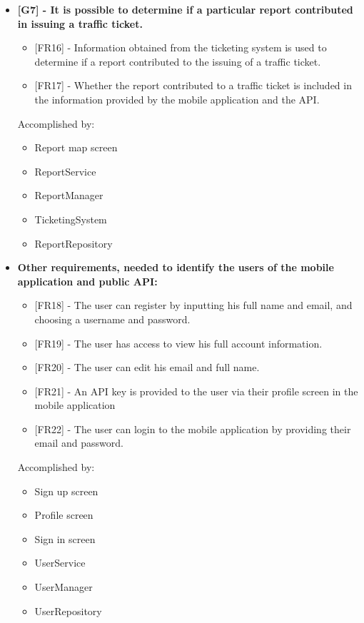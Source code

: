 \begin{itemize}[label={}]
    \item \textbf{[G7] - It is possible to determine if a particular report contributed in issuing a traffic ticket.}
        \begin{itemize}[label={}]
            \item {[FR16]} - Information obtained from the ticketing system is used to determine if a report contributed to the issuing of a traffic ticket.
            \item {[FR17]} - Whether the report contributed to a traffic ticket is included in the information provided by the mobile application and the API.
        \end{itemize}
        Accomplished by:
        \begin{itemize}[label={\textbullet}]
            \item Report map screen
            \item ReportService
            \item ReportManager
            \item TicketingSystem
            \item ReportRepository
        \end{itemize}

    \item \textbf{Other requirements, needed to identify the users of the mobile application and public API:}
        \begin{itemize}[label={}]
            \item {[FR18]} - The user can register by inputting his full name and email, and choosing a username and password.
            \item {[FR19]} - The user has access to view his full account information.
            \item {[FR20]} - The user can edit his email and full name.
            \item {[FR21]} - An API key is provided to the user via their profile screen in the mobile application
            \item {[FR22]} - The user can login to the mobile application by providing their email and password.
        \end{itemize}
        Accomplished by:
        \begin{itemize}[label={\textbullet}]
            \item Sign up screen
            \item Profile screen
            \item Sign in screen
            \item UserService
            \item UserManager
            \item UserRepository
        \end{itemize}


\end{itemize}

